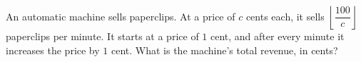 An automatic machine sells paperclips. At a price of $c$ cents each, it sells $\left\lfloor\dfrac{100}{c}\right\rfloor$ paperclips per minute. It starts at a price of $1$ cent, and after every minute it increases the price by $1$ cent. What is the machine's total revenue, in cents?
